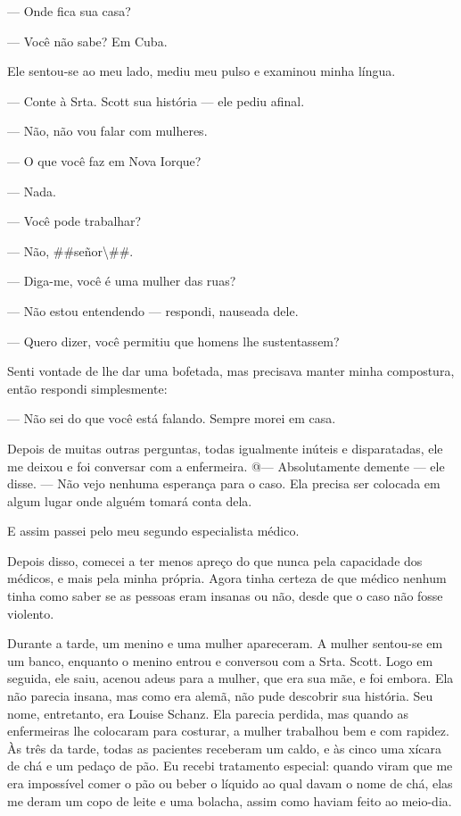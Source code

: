 --- Onde fica sua casa?

--- Você não sabe? Em Cuba.

Ele
sentou-se ao meu lado, mediu meu pulso e examinou minha língua.

--- Conte à Srta. Scott sua história --- ele pediu afinal.

--- Não, não vou falar com mulheres.

--- O que você faz em Nova Iorque?

--- Nada.

--- Você pode trabalhar?

--- Não, \#\#señor\textbackslash{}\#\#.

--- Diga-me, você é uma mulher das ruas?

--- Não estou entendendo --- respondi, nauseada dele.

--- Quero dizer, você permitiu que homens lhe sustentassem?

Senti vontade de lhe dar uma bofetada, mas precisava manter minha
compostura, então respondi simplesmente:

--- Não sei do que você está falando. Sempre morei em casa.

Depois de muitas outras perguntas, todas igualmente inúteis e
disparatadas, ele me deixou e foi conversar com a enfermeira. @---
Absolutamente demente --- ele disse. --- Não vejo nenhuma esperança para
o caso. Ela precisa ser colocada em algum lugar onde alguém tomará conta
dela.

E assim passei pelo meu segundo especialista médico.

Depois disso, comecei a ter menos apreço do que nunca pela capacidade
dos médicos, e mais pela minha própria. Agora tinha certeza de que
médico nenhum tinha como saber se as pessoas eram insanas ou não, desde
que o caso não fosse violento.

Durante a tarde, um menino e uma mulher apareceram. A mulher sentou-se
em um banco, enquanto o menino entrou e conversou com a Srta. Scott.
Logo em seguida, ele saiu, acenou adeus para a mulher, que era sua mãe,
e foi embora. Ela não parecia insana, mas como era alemã, não pude
descobrir sua história. Seu nome, entretanto, era Louise Schanz. Ela
parecia perdida, mas quando as enfermeiras lhe colocaram para costurar,
a mulher trabalhou bem e com rapidez. Às três da tarde, todas as
pacientes receberam um caldo, e às cinco uma xícara de chá e um pedaço
de pão. Eu recebi tratamento especial: quando viram que me era
impossível comer o pão ou beber o líquido ao qual davam o nome de chá,
elas me deram um copo de leite e uma bolacha, assim como haviam feito ao
meio-dia.

